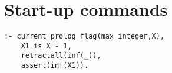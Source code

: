 \section{ Start-up commands }\begin{Verbatim}
:- current_prolog_flag(max_integer,X), 
    X1 is X - 1, 
    retractall(inf(_)),
    assert(inf(X1)).
\end{Verbatim}
